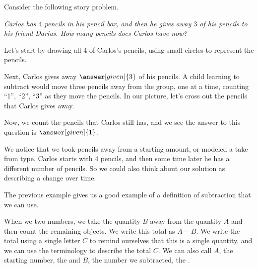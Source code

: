 \documentclass{ximera}
\begin{document}
\begin{example}
Consider the following story problem.

\emph{Carlos has $4$ pencils in his pencil box, and then he gives away $3$ of his pencils to his friend Darius. How many pencils does Carlos have now?}

Let's start by drawing all $4$ of Carlos's pencils, using small circles to represent the pencils.

\begin{image}
\end{image}

Next, Carlos gives away $\answer[given]{3}$ of his pencils. A child learning to subtract would move three pencils away from the group, one at a time, counting ``1'', ``2'', ``3'' as they move the pencils. In our picture, let's cross out the pencils that Carlos gives away.

\begin{image}
\end{image}

Now, we count the pencils that Carlos still has, and we see the answer to this question is $\answer[given]{1}$.

We notice that we took pencils away from a starting amount, or modeled a take from type. Carlos starts with $4$ pencils, and then some time later he has a different number of pencils. So we could also think about our solution as describing a change over time. 

\end{example}


The previous example gives us a good example of a definition of subtraction that we can use.

\begin{definition}
When we  two numbers, we take the quantity $B$ away from the quantity $A$ and then count the remaining objects. We write this total as $A - B$. We write the total using a single letter $C$ to remind ourselves that this is a single quantity, and we can use the terminology  to describe the total $C$. We can also call $A$, the starting number, the  and $B$, the number we subtracted, the .
\begin{image}
\end{image}
\end{definition}
\end{document}

